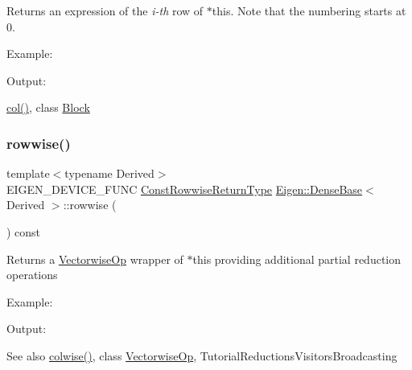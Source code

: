 \begin{DoxyReturn}{Returns}
an expression of the {\itshape i-\/th} row of $\ast$this. Note that the numbering starts at 0.
\end{DoxyReturn}
Example\+: 
\begin{DoxyCodeInclude}{0}
\end{DoxyCodeInclude}
 Output\+: 
\begin{DoxyVerbInclude}
\end{DoxyVerbInclude}
 \mbox{\hyperlink{class_eigen_1_1_dense_base_a469583ed90462820888344e63ebe1a80}{col()}}, class \mbox{\hyperlink{class_eigen_1_1_block}{Block}} \mbox{\label{class_eigen_1_1_dense_base_af9662cd704ffc16c5b88c7b2d331576f}} 
\subsubsection{\texorpdfstring{rowwise()}{rowwise()}\hspace{0.1cm}{\footnotesize\ttfamily [1/2]}}
{\footnotesize\ttfamily template$<$typename Derived$>$ \\
E\+I\+G\+E\+N\+\_\+\+D\+E\+V\+I\+C\+E\+\_\+\+F\+U\+NC \mbox{\hyperlink{class_eigen_1_1_vectorwise_op}{Const\+Rowwise\+Return\+Type}} \mbox{\hyperlink{class_eigen_1_1_dense_base}{Eigen\+::\+Dense\+Base}}$<$ Derived $>$\+::rowwise (\begin{DoxyParamCaption}{ }\end{DoxyParamCaption}) const\hspace{0.3cm}{\ttfamily [inline]}}

\begin{DoxyReturn}{Returns}
a \mbox{\hyperlink{class_eigen_1_1_vectorwise_op}{Vectorwise\+Op}} wrapper of $\ast$this providing additional partial reduction operations
\end{DoxyReturn}
Example\+: 
\begin{DoxyCodeInclude}{0}
\end{DoxyCodeInclude}
 Output\+: 
\begin{DoxyVerbInclude}
\end{DoxyVerbInclude}


\begin{DoxySeeAlso}{See also}
\mbox{\hyperlink{class_eigen_1_1_dense_base_a1c0e1b6067ec1de6cb8799da55aa7d30}{colwise()}}, class \mbox{\hyperlink{class_eigen_1_1_vectorwise_op}{Vectorwise\+Op}}, Tutorial\+Reductions\+Visitors\+Broadcasting 
\end{DoxySeeAlso}
\mbox{\label{class_eigen_1_1_dense_base_a6daa3a3156ca0e0722bf78638e1c7f28}} 

